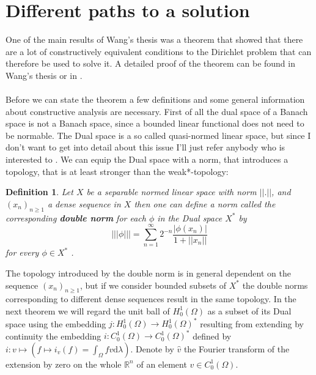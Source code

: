 \documentclass[11pt,a4paper,leqno]{report}
\newtheorem{definition}[theorem]{Definition}
\numberwithin{equation}{chapter}
\begin{document}
\section{Different paths to a solution}
One of the main results of Wang's thesis was a theorem that showed that there are a lot of constructively equivalent conditions to the Dirichlet problem that can therefore be used to solve it. A detailed proof of the theorem can be found in Wang's thesis \cite{Wang} or in \cite{CWSDP}.\\
\\
Before we can state the theorem a few definitions and some general information about constructive analysis are necessary. First of all the dual space of a Banach space is not a Banach space, since a bounded linear functional does not need to be normable. The Dual space is a so called quasi-normed linear space, but since I don't want to get into detail about this issue I'll just refer anybody who is interested to \cite{CANA}. We can equip the Dual space with a norm, that introduces a topology, that is at least stronger than the weak*-topology:
\begin{definition} Let $X$ be a separable normed linear space with norm $||.||$, and $(x_n)_{n\geq 1}$ a dense sequence in $X$ then one can define a norm called the corresponding \textbf{double norm} for each $\phi$ in the Dual space $X^*$ by
\begin{equation} |||\phi|||=\sum_{n=1}^\infty 2^{-n}\frac{|\phi(x_n)|}{1+||x_n||}\end{equation}for every $\phi\in X^*$ \cite{CANA}.\end{definition}
The topology introduced by the double norm is in general dependent on the sequence $(x_n)_{n\geq 1}$, but if we consider bounded subsets of $X^*$ the double norms corresponding to different dense sequences result in the same topology. 
In the next theorem we will regard the unit ball of $H^1_0(\Omega)$ as a subset of its Dual space using the embedding $j:H^1_0(\Omega)\rightarrow H^1_0(\Omega)^*$ resulting from extending by continuity the embedding $i:C^1_0(\Omega)\rightarrow C^1_0(\Omega)^*$ defined by $i:v\mapsto (f\mapsto i_v(f)=\int_\Omega f v \mathrm{d}\lambda)$. 
Denote by $\hat{v}$ the Fourier transform of the extension by zero on the whole $\mathbb{R}^n$ of an element $v\in C^1_0(\Omega)$. 
\end{document}
